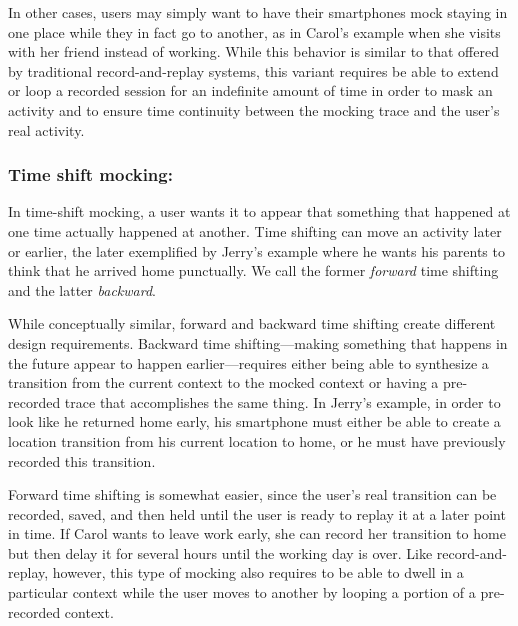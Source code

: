 In other cases, \PocketMocker{} users may simply want to have their smartphones
mock staying in one place while they in fact go to another, as in
Carol's example when she visits with her friend instead of working. While this
behavior is similar to that offered by traditional record-and-replay systems,
this variant requires \PocketMocker{} be able to extend or loop a recorded
session for an indefinite amount of time in order to mask an activity and to
ensure time continuity between the mocking trace and the user's real activity.

\subsubsection{Time shift mocking:\space}

In time-shift mocking, a user wants it to appear that something that happened
at one time actually happened at another. Time shifting can move an activity
later or earlier, the later exemplified by Jerry's example where he wants his
parents to think that he arrived home punctually. We call the former
\textit{forward} time shifting and the latter \textit{backward}.

While conceptually similar, forward and backward time shifting create
different design requirements. Backward time shifting---making something that
happens in the future appear to happen earlier---requires either being able
to synthesize a transition from the current context to the mocked context or
having a pre-recorded trace that accomplishes the same thing. In Jerry's
example, in order to look like he returned home early, his smartphone must
either be able to create a location transition from his current location to
home, or he must have previously recorded this transition.

Forward time shifting is somewhat easier, since the user's real transition can
be recorded, saved, and then held until the user is ready to replay it at a
later point in time. If Carol wants to leave work early, she can record her
transition to home but then delay it for several hours until the working day
is over. Like record-and-replay, however, this type of mocking also requires
\PocketMocker{} to be able to dwell in a particular context while the user
moves to another by looping a portion of a pre-recorded context.
